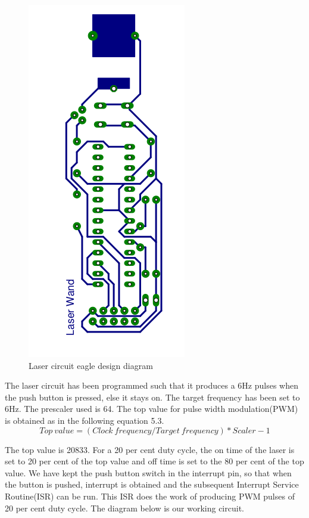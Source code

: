 \documentclass[12pt, a4paper]{article}
\begin{document}
\begin{figure}[htp]
	\centering
	\includegraphics[scale=0.3]{eagle-non-mirror.png}
	\caption{Laser circuit eagle design diagram}
	\label{}
\end{figure}

	The laser circuit has been programmed such that it produces a 6Hz pulses when the push button is pressed, else it stays on. The target frequency has been set to 6Hz. The prescaler used is 64. The top value for pulse width modulation(PWM) is obtained as in the following equation 5.3. 
	\begin{equation}
	Top\ value = (Clock\  frequency/Target\  frequency)*Scaler - 1
	\end{equation}
	
	The top value is 20833. For a 20 per cent duty cycle, the on time of the laser is set to 20 per cent of the top value and off time is set to the 80 per cent of the top value. We have kept the push button switch in the interrupt pin, so that when the button is pushed, interrupt is obtained and the subsequent Interrupt Service Routine(ISR) can be run. This ISR does the work of producing PWM pulses of 20 per cent duty cycle. The diagram below is our working circuit.
\end{document}
